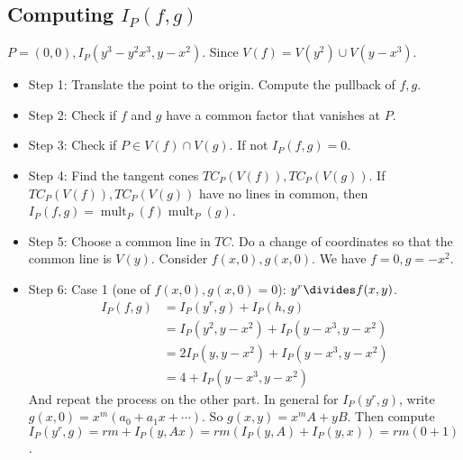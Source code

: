 \documentclass{report}
\begin{document}
\begin{topic}
    \section{Computing $I_{P}(f, g)$}
\end{topic}

\begin{examples}
    \begin{example}
        $P = (0, 0), I_{P}(y^{3} - y^{2}x^{3}, y - x^{2})$. Since $V(f) = V(y^{2}) \cup V(y - x^{3})$. 
            \begin{itemize}
                \item Step 1: Translate the point to the origin. Compute the pullback of $f, g$.

                \item Step 2: Check if $f$ and $g$ have a common factor that vanishes at $P$.

                \item Step 3: Check if $P \in V(f) \cap V(g)$. If not $I_{P}(f, g) = 0$.

                \item Step 4: Find the tangent cones $TC_{P}(V(f)), TC_{P}(V(g))$. If $TC_{P}(V(f)), TC_{P}(V(g))$ have no lines in common, then $I_{P}(f, g) = \mathop{mult}_{P}(f) \mathop{mult}_{P}(g)$.

                \item Step 5: Choose a common line in $TC$. Do a change of coordinates so that the common line is $V(y)$. Consider $f(x, 0), g(x, 0)$. We have $f = 0, g= -x^{2}$.

                \item Step 6: Case 1 (one of $f(x, 0), g(x, 0) = 0$): $y^{r} \divides f(x, y)$.
                    \begin{align*}
                        I_{P}(f, g) &= I_{P}(y^{r}, g) + I_{P}(h, g)                        \\
                                    &= I_{P}(y^{2}, y - x^{2}) + I_{P}(y - x^{3}, y- x^{2}) \\
                                    &= 2I_{P}(y, y - x^{2}) + I_{P}(y - x^{3}, y - x^{2})   \\
                                    &= 4 + I_{P}(y - x^{3}, y - x^{2})                        
                    \end{align*}
                And repeat the process on the other part. In general for $I_{P}(y^{r}, g)$, write $g(x, 0) = x^{m}(a_{0} + a_{1}x  + \cdots )$. So $g(x, y) = x^{m}A + yB$. Then compute $I_{P}(y^{r}, g) = rm + I_{P}(y, Ax) = rm (I_{P}(y, A) + I_{P}(y, x)) = rm(0 + 1)$.


\end{itemize}
\end{example}
\end{examples}
\end{document}
